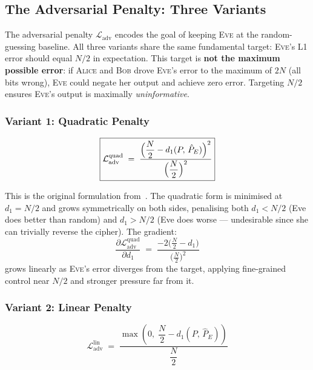 \documentclass[12pt, a4paper]{article}
\newcommand{\alice}{\textsc{Alice}}
\newcommand{\bob}{\textsc{Bob}}
\newcommand{\eve}{\textsc{Eve}}
\begin{document}
\subsection{The Adversarial Penalty: Three Variants}
\label{subsec:adv_penalty}

The adversarial penalty $\mathcal{L}_{\mathrm{adv}}$ encodes the goal
of keeping \eve{} at the random-guessing baseline. All three variants
share the same fundamental target: \eve{}'s L1 error should equal $N/2$
in expectation. This target is \textbf{not the maximum possible error}:
if \alice{} and \bob{} drove \eve{}'s error to the maximum of $2N$
(all bits wrong), \eve{} could negate her output and achieve zero error.
Targeting $N/2$ ensures \eve{}'s output is maximally \emph{uninformative}.

\subsubsection*{Variant 1: Quadratic Penalty}

\begin{equation}
  \boxed{
  \mathcal{L}_{\mathrm{adv}}^{\mathrm{quad}}
  \;=\;
  \frac{\Bigl(\dfrac{N}{2} - d_1(P,\, \hat{P}_E)\Bigr)^2}
       {\Bigl(\dfrac{N}{2}\Bigr)^2}
  }
  \label{eq:adv_quad}
\end{equation}

This is the original formulation from~\cite{abadi2016learning}. The
quadratic form is minimised at $d_1 = N/2$ and grows symmetrically
on both sides, penalising both $d_1 < N/2$ (Eve does better than
random) and $d_1 > N/2$ (Eve does worse --- undesirable since she
can trivially reverse the cipher). The gradient:
%
\begin{equation}
  \frac{\partial \mathcal{L}_{\mathrm{adv}}^{\mathrm{quad}}}{\partial d_1}
  \;=\; \frac{-2\bigl(\tfrac{N}{2} - d_1\bigr)}{\bigl(\tfrac{N}{2}\bigr)^2}
  \label{eq:quad_grad}
\end{equation}
%
grows linearly as \eve{}'s error diverges from the target, applying
fine-grained control near $N/2$ and stronger pressure far from it.

\subsubsection*{Variant 2: Linear Penalty}

\begin{equation}
  \mathcal{L}_{\mathrm{adv}}^{\mathrm{lin}}
  \;=\;
  \frac{\max\!\left(0,\;\dfrac{N}{2} - d_1(P,\, \hat{P}_E)\right)}
       {\dfrac{N}{2}}
  \label{eq:adv_linear}
\end{equation}
\end{document}
